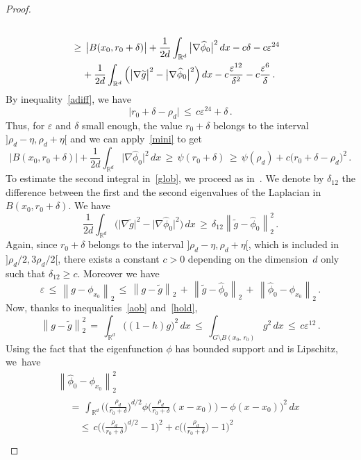 \documentclass[10pt]{amsart}
\theoremstyle{definition}\newtheorem{defi}[theo]{Definition}\newtheorem{rema}[theo]{Remark}\newtheorem{exam}[theo]{Example}\newtheorem{exem}[theo]{Example}\newtheorem{nota}[theo]{Notation}
\newcommand*\Rd {{\mathbb R^d}}
\newcommand*\hp{{\widehat \phi}}
\newcommand*\gt{\widetilde g}
\begin{document}
\begin{proof}
\begin{multline}
\begin{aligned}
\\
&\geq\,\big|B(x_0,r_0+\delta)\big| +\frac{1}{2d}
\int_{\Rd}\big|\nabla \hp_0\big|^2\,dx -c\delta -c\varepsilon^{24}\\
&\mkern20mu+\frac{1}{2d}
\int_{\Rd}\Big(\big|\nabla \gt\big|^2 -\big|\nabla \hp_0\big|^2\Big)\,dx -c
\frac{\varepsilon^{12}}{\delta^2}- c
\frac{\varepsilon^{6}}{\delta}
\,.
\end{aligned}
\end{multline}
By inequality~\eqref{adiff}, we have
\begin{equation}\label{ulto}
\big|r_0+\delta-\rho_d\big|\,\leq\, c\varepsilon^{24}+\delta\,.
\end{equation}
Thus, for $\varepsilon$ and $\delta$ small enough, the value $r_0+\delta$ belongs to the interval $]\rho_d-\eta,\rho_d+\eta[$ and we can apply~\eqref{mini} to get
\begin{equation}\label{intert}
\big|B(x_0,r_0+\delta)\big| +\frac{1}{2d}
\int_{\Rd}\big|\nabla \hp_0\big|^2\,dx
\,\geq\,\psi (r_0+\delta)
\,\geq\,
\psi(\rho_d)+c\big(r_0+\delta-\rho_d\big)^2\,.
\end{equation}
To estimate the second integral in~\eqref{glob}, we proceed as in~\cite[Lemma~$A.1$]{BO}. We denote by $\delta_{12}$ the difference between the first and the second eigenvalues of the Laplacian in $B(x_0,r_0+\delta)$. We have
\[
\frac{1}{2d}
\int_{\Rd}\Big(\big|\nabla \gt\big|^2 -\big|\nabla \hp_0\big|^2\Big)\,dx
\,\geq\,
\delta_{12}\left\|\gt-\hp_0\right\|_2^2\,.
\]
Again, since $r_0+\delta$ belongs to the interval $]\rho_d-\eta,\rho_d+\eta[$, which is included in $]\rho_d/2,3\rho_d/2[$, there exists a constant $c>0$ depending on the dimension~$d$ only such that $\delta_{12}\geq c$. Moreover we have
\[
\varepsilon\,\leq\,\left\|g-\phi_{x_0}\right\|_2\,\leq\, \left\|g-\gt\right\|_2\,+\, \left\|\gt-\hp_0\right\|_2\,+\, \left\|\hp_0-\phi_{x_0}\right\|_2\,.
\]
Now, thanks to inequalities~\eqref{aob} and~\eqref{hold},
\[
\left\|g-\gt\right\|_2^2\,=\,
\int_{\Rd}\big((1-h)g\big)^2\,dx\,\leq\,
\int_{G\setminus B(x_0,\,r_0)}g^2\,dx\,\leq\, c {\varepsilon^{12}}\,.
\]
Using the fact that the eigenfunction $\phi$ has bounded support and is Lipschitz, we~have
\begin{multline*}
\left\|\hp_0-\phi_{x_0}\right\|_2^2
\\
\begin{aligned}
&=\,\int_{\Rd}
\Bigg(
\Big(\frac{\rho_d}{r_0+\delta}\Big)^{d/2}
\phi\Big(
\frac{\rho_d}{r_0+\delta}(x-x_0)\Big) -\phi(x-x_0)\Bigg)^2\,dx\\
&\quad\leq\, c\Bigg(\Big(\frac{\rho_d}{r_0+\delta}\Big)^{d/2}-1\Bigg)^2 +c\Bigg(\Big(\frac{\rho_d}{r_0+\delta}\Big)-1\Bigg)^2\\

\end{aligned}
\end{multline*}
\end{proof}
\end{document}
